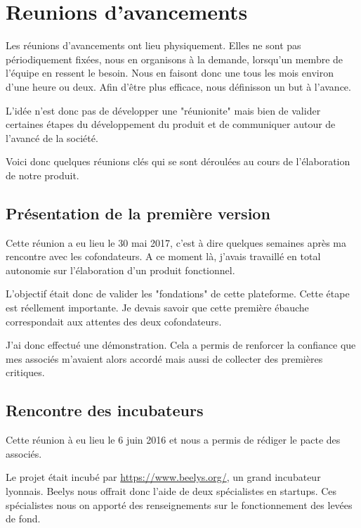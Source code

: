 \documentclass[]{report}
\begin{document}
  \section{Reunions d'avancements}

    Les réunions d'avancements ont lieu physiquement. Elles ne sont pas périodiquement fixées, nous en organisons à la demande, lorsqu'un membre de l'équipe en ressent le besoin. Nous en faisont donc une tous les mois environ d'une heure ou deux. Afin d'être plus efficace, nous définisson un but à l'avance.

    L'idée n'est donc pas de développer une "réunionite" mais bien de valider certaines étapes du développement du produit et de communiquer autour de l'avancé de la société.

    Voici donc quelques réunions clés qui se sont déroulées au cours de l'élaboration de notre produit.

    \subsection{Présentation de la première version}

      Cette réunion a eu lieu le 30 mai 2017, c'est à dire quelques semaines après ma rencontre avec les cofondateurs. A ce moment là, j'avais travaillé en total autonomie sur l'élaboration d'un produit fonctionnel.

      L'objectif était donc de valider les "fondations" de cette plateforme. Cette étape est réellement importante. Je devais savoir que cette première ébauche correspondait aux attentes des deux cofondateurs.

      J'ai donc effectué une démonstration. Cela a permis de renforcer la confiance que mes associés m'avaient alors accordé mais aussi de collecter des premières critiques.

    \subsection{Rencontre des incubateurs}

      Cette réunion à eu lieu le 6 juin 2016 et nous a permis de rédiger le pacte des associés.

      Le projet était incubé par \href{Beelys}{https://www.beelys.org/}, un grand incubateur lyonnais. Beelys nous offrait donc l'aide de deux spécialistes en startups. Ces spécialistes nous on apporté des renseignements sur le fonctionnement des levées de fond.
\end{document}
